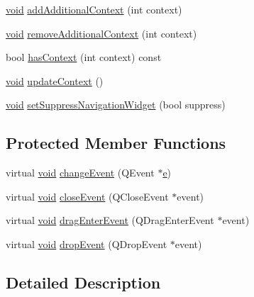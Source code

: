 \begin{DoxyCompactItemize}
\hyperlink{group___u_a_v_objects_plugin_ga444cf2ff3f0ecbe028adce838d373f5c}{void} \hyperlink{group___core_plugin_ga9175af5b201aed3337576aa33ff7e6f9}{add\-Additional\-Context} (int context)
\item 
\hyperlink{group___u_a_v_objects_plugin_ga444cf2ff3f0ecbe028adce838d373f5c}{void} \hyperlink{group___core_plugin_gae4a57783151dc82cd401ab8171eccfc6}{remove\-Additional\-Context} (int context)
\item 
bool \hyperlink{group___core_plugin_gafd618f7b7c48a635b0c81f3e9f2a1866}{has\-Context} (int context) const 
\item 
\hyperlink{group___u_a_v_objects_plugin_ga444cf2ff3f0ecbe028adce838d373f5c}{void} \hyperlink{group___core_plugin_ga63b04fba7b802e0b931cb68d4cf78968}{update\-Context} ()
\item 
\hyperlink{group___u_a_v_objects_plugin_ga444cf2ff3f0ecbe028adce838d373f5c}{void} \hyperlink{group___core_plugin_gae79dabcd76e97c71278aeb64202efd8b}{set\-Suppress\-Navigation\-Widget} (bool suppress)
\end{DoxyCompactItemize}
\subsection*{\-Protected \-Member \-Functions}
\begin{DoxyCompactItemize}
\item 
virtual \hyperlink{group___u_a_v_objects_plugin_ga444cf2ff3f0ecbe028adce838d373f5c}{void} \hyperlink{group___core_plugin_gaf4ca5d0d3d18ddcb7d54b6596bbf4797}{change\-Event} (\-Q\-Event $\ast$\hyperlink{_o_p_plots_8m_a9425be9aab51621e317ba7ade564b570}{e})
\item 
virtual \hyperlink{group___u_a_v_objects_plugin_ga444cf2ff3f0ecbe028adce838d373f5c}{void} \hyperlink{group___core_plugin_ga4e20a4a065fbb0e4d3532a45a0a91425}{close\-Event} (\-Q\-Close\-Event $\ast$event)
\item 
virtual \hyperlink{group___u_a_v_objects_plugin_ga444cf2ff3f0ecbe028adce838d373f5c}{void} \hyperlink{group___core_plugin_ga671bf73078069470c19965a3d948b6fa}{drag\-Enter\-Event} (\-Q\-Drag\-Enter\-Event $\ast$event)
\item 
virtual \hyperlink{group___u_a_v_objects_plugin_ga444cf2ff3f0ecbe028adce838d373f5c}{void} \hyperlink{group___core_plugin_gae7b97e68c51358f6f36be3c40b89c01c}{drop\-Event} (\-Q\-Drop\-Event $\ast$event)
\end{DoxyCompactItemize}


\subsection{\-Detailed \-Description}


